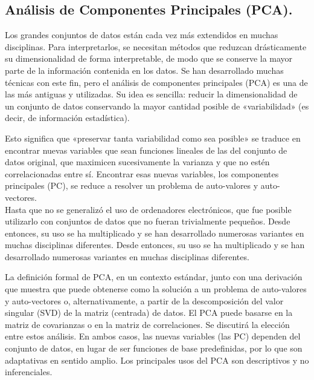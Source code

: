 \documentclass[spanish,11pt,letterpaper,oneside]{memoir}
\begin{document}
\subsection{Análisis de Componentes Principales (PCA).}
	Los grandes conjuntos de datos están cada vez más extendidos en muchas disciplinas. Para interpretarlos, se necesitan métodos que reduzcan drásticamente su dimensionalidad de forma interpretable, de modo que se conserve la mayor parte de la información contenida en los datos. Se han desarrollado muchas técnicas con este fin, pero el análisis de componentes principales (PCA) es una de las más antiguas y utilizadas. Su idea es sencilla: reducir la dimensionalidad de un conjunto de datos conservando la mayor cantidad posible de «variabilidad» (es decir, de información estadística).
	
	Esto significa que «preservar tanta variabilidad como sea posible» se traduce en encontrar nuevas variables que sean funciones lineales de las del conjunto de datos original, que maximicen sucesivamente la varianza y que no estén correlacionadas entre sí. Encontrar esas nuevas variables, los componentes principales (PC), se reduce a resolver un problema de auto-valores y auto-vectores. \\
	
	Hasta que no se generalizó el uso de ordenadores electrónicos, que fue posible utilizarlo con conjuntos de datos que no fueran trivialmente pequeños. Desde entonces, su uso se ha multiplicado y se han desarrollado numerosas variantes en muchas disciplinas diferentes. Desde entonces, su uso se ha multiplicado y se han desarrollado numerosas variantes en muchas disciplinas diferentes. 
	
	La definición formal de PCA, en un contexto estándar, junto con una derivación que muestra que puede obtenerse como la solución a un problema de auto-valores y auto-vectores o, alternativamente, a partir de la descomposición del valor singular (SVD) de la matriz (centrada) de datos. El PCA puede basarse en la matriz de covarianzas o en la matriz de correlaciones. Se discutirá la elección entre estos análisis. En ambos casos, las nuevas variables (las PC) dependen del conjunto de datos, en lugar de ser funciones de base predefinidas, por lo que son adaptativas en sentido amplio. Los principales usos del PCA son descriptivos y no inferenciales.\cite{Joliiffe16}\\
\end{document}
